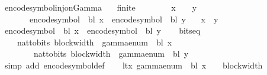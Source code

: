 \begin{isabellebody}
\begin{isamarkuptext}
\end{isamarkuptext}\isamarkuptrue%
\isamarkupfalse%
\ encode{\isacharunderscore}{\kern0pt}symbol{\isacharunderscore}{\kern0pt}inj{\isacharunderscore}{\kern0pt}on{\isacharunderscore}{\kern0pt}Gamma{\isacharcolon}{\kern0pt}\isanewline
\ \ \ {\isachardoublequoteopen}finite\ {\isasymGamma}{\isachardoublequoteclose}\isanewline
\ \ \ \ \ \ \ {\isachardoublequoteopen}x\ {\isasymin}\ {\isasymGamma}{\isachardoublequoteclose}\ \ {\isachardoublequoteopen}y\ {\isasymin}\ {\isasymGamma}{\isachardoublequoteclose}\isanewline
\ \ \ \ \ \ \ {\isachardoublequoteopen}encode{\isacharunderscore}{\kern0pt}symbol\ {\isasymGamma}\ bl\ x\ {\isacharequal}{\kern0pt}\ encode{\isacharunderscore}{\kern0pt}symbol\ {\isasymGamma}\ bl\ y{\isachardoublequoteclose}\isanewline
\ \ \ {\isachardoublequoteopen}x\ {\isacharequal}{\kern0pt}\ y{\isachardoublequoteclose}\isanewline
%
\isadelimproof
%
\endisadelimproof
%
\isatagproof
{}\isamarkupfalse%
\ {\isacharminus}{\kern0pt}\isanewline
\ \ \isamarkupfalse%
\ {\isacartoucheopen}encode{\isacharunderscore}{\kern0pt}symbol\ {\isasymGamma}\ bl\ x\ {\isacharequal}{\kern0pt}\ encode{\isacharunderscore}{\kern0pt}symbol\ {\isasymGamma}\ bl\ y{\isacartoucheclose}\isanewline
\ \ \isamarkupfalse%
\ bits{\isacharunderscore}{\kern0pt}eq{\isacharcolon}{\kern0pt}\isanewline
\ \ \ \ {\isachardoublequoteopen}nat{\isacharunderscore}{\kern0pt}to{\isacharunderscore}{\kern0pt}bits\ {\isacharparenleft}{\kern0pt}block{\isacharunderscore}{\kern0pt}width\ {\isasymGamma}{\isacharparenright}{\kern0pt}\ {\isacharparenleft}{\kern0pt}gamma{\isacharunderscore}{\kern0pt}enum\ {\isasymGamma}\ bl\ x{\isacharparenright}{\kern0pt}\isanewline
\ \ \ \ \ \ \ {\isacharequal}{\kern0pt}\ nat{\isacharunderscore}{\kern0pt}to{\isacharunderscore}{\kern0pt}bits\ {\isacharparenleft}{\kern0pt}block{\isacharunderscore}{\kern0pt}width\ {\isasymGamma}{\isacharparenright}{\kern0pt}\ {\isacharparenleft}{\kern0pt}gamma{\isacharunderscore}{\kern0pt}enum\ {\isasymGamma}\ bl\ y{\isacharparenright}{\kern0pt}{\isachardoublequoteclose}\isanewline
\ \ \ \ \isamarkupfalse%
\ {\isacharparenleft}{\kern0pt}simp\ add{\isacharcolon}{\kern0pt}\ encode{\isacharunderscore}{\kern0pt}symbol{\isacharunderscore}{\kern0pt}def{\isacharparenright}{\kern0pt}\isanewline
\ \ \isamarkupfalse%
\ lt{\isacharunderscore}{\kern0pt}x{\isacharcolon}{\kern0pt}\ {\isachardoublequoteopen}gamma{\isacharunderscore}{\kern0pt}enum\ {\isasymGamma}\ bl\ x\ {\isacharless}{\kern0pt}\ {}\ {\isacharcircum}{\kern0pt}\ block{\isacharunderscore}{\kern0pt}width\ {\isasymGamma}{\isachardoublequoteclose}\isanewline

\end{isabellebody}
